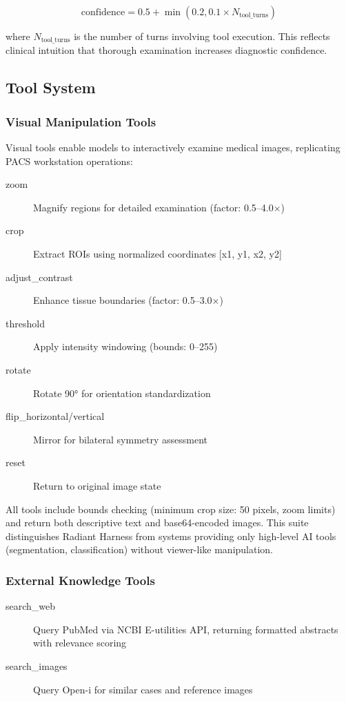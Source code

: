\documentclass[11pt]{article}
\begin{document}
\begin{equation}
\label{eq:confidence}
    \text{confidence} = 0.5 + \min\left(0.2, 0.1 \times N_{\text{tool\_turns}}\right)
\end{equation}

where $N_{\text{tool\_turns}}$ is the number of turns involving tool execution. This reflects clinical intuition that thorough examination increases diagnostic confidence.

\subsection{Tool System}

\subsubsection{Visual Manipulation Tools}

Visual tools enable models to interactively examine medical images, replicating PACS workstation operations:

\begin{description}
    \item[zoom] Magnify regions for detailed examination (factor: 0.5--4.0$\times$)
    \item[crop] Extract ROIs using normalized coordinates [x1, y1, x2, y2]
    \item[adjust\_contrast] Enhance tissue boundaries (factor: 0.5--3.0$\times$)
    \item[threshold] Apply intensity windowing (bounds: 0--255)
    \item[rotate] Rotate 90° for orientation standardization
    \item[flip\_horizontal/vertical] Mirror for bilateral symmetry assessment
    \item[reset] Return to original image state
\end{description}

All tools include bounds checking (minimum crop size: 50 pixels, zoom limits) and return both descriptive text and base64-encoded images. This suite distinguishes Radiant Harness from systems providing only high-level AI tools (segmentation, classification) without viewer-like manipulation.

\subsubsection{External Knowledge Tools}

\begin{description}
    \item[search\_web] Query PubMed via NCBI E-utilities API, returning formatted abstracts with relevance scoring
    \item[search\_images] Query Open-i for similar cases and reference images
\end{description}
\end{document}
